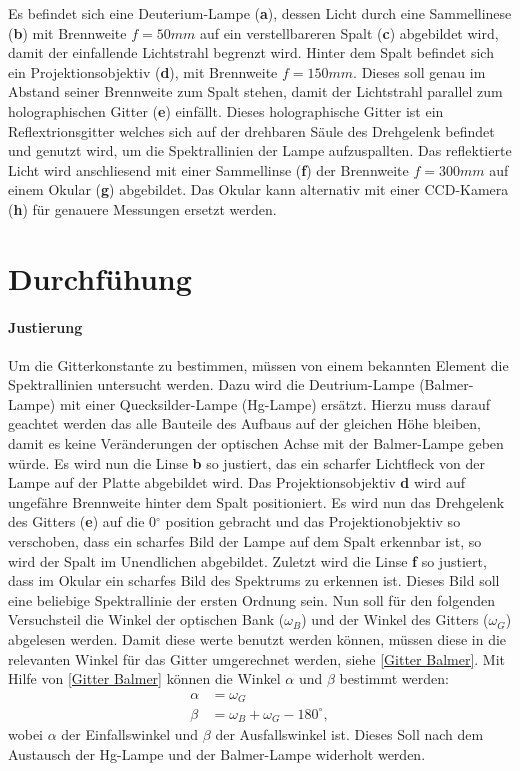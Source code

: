 Es befindet sich eine Deuterium-Lampe (\textbf{a}), dessen Licht durch eine Sammellinese (\textbf{b}) mit Brennweite $f = 50mm$ auf ein verstellbareren Spalt (\textbf{c}) abgebildet wird, damit der einfallende Lichtstrahl begrenzt wird. 
Hinter dem Spalt befindet sich ein Projektionsobjektiv (\textbf{d}), mit Brennweite $f = 150mm$. 
Dieses soll genau im Abstand seiner Brennweite zum Spalt stehen, damit der Lichtstrahl parallel zum holographischen Gitter (\textbf{e}) einfällt. 
Dieses holographische Gitter ist ein Reflextrionsgitter welches sich auf der drehbaren Säule des Drehgelenk befindet und genutzt wird, um die Spektrallinien der Lampe aufzuspallten. 
Das reflektierte Licht wird anschliesend mit einer Sammellinse (\textbf{f}) der Brennweite $f=300mm$ auf einem Okular (\textbf{g}) abgebildet.
Das Okular kann alternativ mit einer CCD-Kamera (\textbf{h}) für genauere Messungen ersetzt werden.

\section{Durchfühung}

\paragraph{Justierung}

Um die Gitterkonstante zu bestimmen, müssen von einem bekannten Element die Spektrallinien untersucht werden. 
Dazu wird die Deutrium-Lampe (Balmer-Lampe) mit einer Quecksilder-Lampe (Hg-Lampe) ersätzt. 
Hierzu muss darauf geachtet werden das alle Bauteile des Aufbaus auf der gleichen Höhe bleiben, damit es keine Veränderungen der optischen Achse mit der Balmer-Lampe geben würde.
Es wird nun die Linse \textbf{b} so justiert, das ein scharfer Lichtfleck von der Lampe auf der Platte abgebildet wird.
Das Projektionsobjektiv \textbf{d} wird auf ungefähre Brennweite hinter dem Spalt positioniert. 
Es wird nun das Drehgelenk des Gitters (\textbf{e}) auf die 0$^\circ$ position gebracht und das Projektionobjektiv so verschoben, dass ein scharfes Bild der Lampe auf dem Spalt erkennbar ist, so wird der Spalt im Unendlichen abgebildet.
Zuletzt wird die Linse \textbf{f} so justiert, dass im Okular ein scharfes Bild des Spektrums zu erkennen ist. Dieses Bild soll eine beliebige Spektrallinie der ersten Ordnung sein.
Nun soll für den folgenden Versuchsteil die Winkel der optischen Bank ($\omega_B$) und der Winkel des Gitters ($\omega_G$) abgelesen werden.  
Damit diese werte benutzt werden können, müssen diese in die relevanten Winkel für das Gitter umgerechnet werden, siehe \cref{Gitter Balmer}. 
Mit Hilfe von \cref{Gitter Balmer} können die Winkel $\alpha$ und $\beta$ bestimmt werden: 
\begin{align}
    \alpha &= \omega_G \\  \beta &= \omega_B + \omega_G - 180^\circ,
\end{align}
wobei $\alpha$ der Einfallswinkel und $\beta$ der Ausfallswinkel ist.
Dieses Soll nach dem Austausch der Hg-Lampe und der Balmer-Lampe widerholt werden. 


